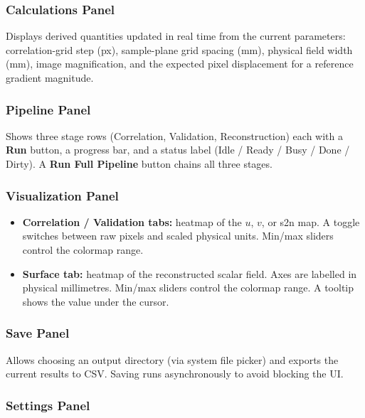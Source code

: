 \documentclass[11pt]{article}
\begin{document}
\subsubsection{Calculations Panel}

Displays derived quantities updated in real time from the current
parameters: correlation-grid step (px), sample-plane grid spacing (mm),
physical field width (mm), image magnification, and the expected
pixel displacement for a reference gradient magnitude.


\subsubsection{Pipeline Panel}

Shows three stage rows (Correlation, Validation, Reconstruction) each with
a \textbf{Run} button, a progress bar, and a status label (Idle / Ready /
Busy / Done / Dirty). A \textbf{Run Full Pipeline} button chains all three stages.

\subsubsection{Visualization Panel}

\begin{itemize}[noitemsep]
  \item \textbf{Correlation / Validation tabs:} heatmap of the $u$, $v$,
        or s2n map. A toggle switches between raw pixels and scaled
        physical units. Min/max sliders control the colormap range.
  \item \textbf{Surface tab:} heatmap of the reconstructed scalar field.
        Axes are labelled in physical millimetres. Min/max sliders control
        the colormap range. A tooltip shows the value under the cursor.
\end{itemize}

\subsubsection{Save Panel}

Allows choosing an output directory (via system file picker) and exports
the current results to CSV. Saving runs asynchronously to avoid blocking
the UI.

\subsubsection{Settings Panel}
\end{document}
